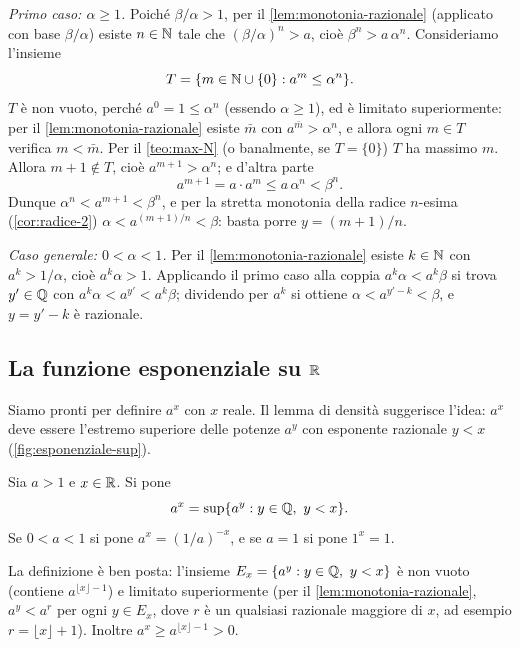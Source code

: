 \begin{dimostrazione}
\emph{Primo caso: $\alpha\ge1$.} Poiché $\beta/\alpha>1$, per il
\cref{lem:monotonia-razionale} (applicato con base $\beta/\alpha$) esiste $n\in\mathbb{N}$ tale
che $(\beta/\alpha)^{n}>a$, cioè $\beta^{n}>a\,\alpha^{n}$. Consideriamo l'insieme
\[
  T=\{m\in\mathbb{N}\cup\{0\} : a^{m}\le\alpha^{n}\}.
\]
$T$ è non vuoto, perché $a^{0}=1\le\alpha^{n}$ (essendo $\alpha\ge1$), ed è limitato
superiormente: per il \cref{lem:monotonia-razionale} esiste $\bar m$ con
$a^{\bar m}>\alpha^{n}$, e allora ogni $m\in T$ verifica $m<\bar m$. Per il
\cref{teo:max-N} (o banalmente, se $T=\{0\}$) $T$ ha massimo $m$. Allora $m+1\notin T$,
cioè $a^{m+1}>\alpha^{n}$; e d'altra parte
\[
  a^{m+1}=a\cdot a^{m}\le a\,\alpha^{n}<\beta^{n}.
\]
Dunque $\alpha^{n}<a^{m+1}<\beta^{n}$, e per la stretta monotonia della radice $n$-esima
(\cref{cor:radice-2}) $\alpha<a^{(m+1)/n}<\beta$: basta porre $y=(m+1)/n$.

\emph{Caso generale: $0<\alpha<1$.} Per il \cref{lem:monotonia-razionale} esiste
$k\in\mathbb{N}$ con $a^{k}>1/\alpha$, cioè $a^{k}\alpha>1$. Applicando il primo caso alla
coppia $a^{k}\alpha<a^{k}\beta$ si trova $y'\in\mathbb{Q}$ con $a^{k}\alpha<a^{y'}<a^{k}\beta$;
dividendo per $a^{k}$ si ottiene $\alpha<a^{y'-k}<\beta$, e $y=y'-k$ è razionale.
\end{dimostrazione}

\subsection{La funzione esponenziale su \texorpdfstring{$\mathbb{R}$}{R}}

Siamo pronti per definire $a^{x}$ con $x$ reale. Il lemma di densità suggerisce
l'idea: $a^{x}$ deve essere l'estremo superiore delle potenze $a^{y}$ con esponente
razionale $y<x$ (\cref{fig:esponenziale-sup}).

\begin{definizione}\label{def:potenza-reale}
Sia $a>1$ e $x\in\mathbb{R}$. Si pone
\begin{equation}\label{eq:esponenziale-sup}
  a^{x}=\sup\{a^{y} : y\in\mathbb{Q},\ y<x\}.
\end{equation}
Se $0<a<1$ si pone $a^{x}=(1/a)^{-x}$, e se $a=1$ si pone $1^{x}=1$.
\end{definizione}

La definizione è ben posta: l'insieme $E_{x}=\{a^{y} : y\in\mathbb{Q},\ y<x\}$ è non vuoto
(contiene $a^{\lfloor x\rfloor-1}$) e limitato superiormente (per il
\cref{lem:monotonia-razionale}, $a^{y}<a^{r}$ per ogni $y\in E_{x}$, dove $r$ è un
qualsiasi razionale maggiore di $x$, ad esempio $r=\lfloor x\rfloor+1$). Inoltre
$a^{x}\ge a^{\lfloor x\rfloor-1}>0$.

